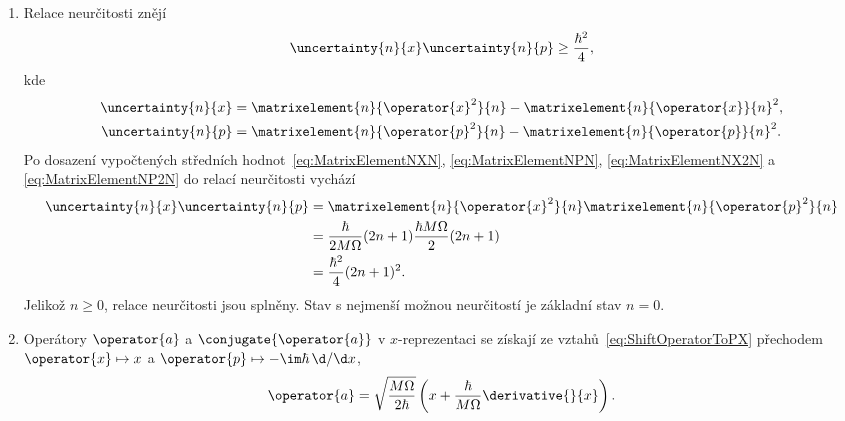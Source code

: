 \begin{solution}
\begin{enumerate}
	\item
		Relace neurčitosti znějí
		\begin{equation}
			\uncertainty{n}{x}\uncertainty{n}{p}\geq\frac{\hbar^{2}}{4},
		\end{equation}
		kde
		\begin{subequations}
			\begin{align}
				\uncertainty{n}{x}
					&=\matrixelement{n}{\operator{x}^{2}}{n}-\matrixelement{n}{\operator{x}}{n}^{2},\\
					\uncertainty{n}{p}
					&=\matrixelement{n}{\operator{p}^{2}}{n}-\matrixelement{n}{\operator{p}}{n}^{2}.
			\end{align}
		\end{subequations}
		Po dosazení vypočtených středních hodnot~\eqref{eq:MatrixElementNXN}, \eqref{eq:MatrixElementNPN}, \eqref{eq:MatrixElementNX2N} a \eqref{eq:MatrixElementNP2N} do relací neurčitosti vychází
		\begin{align}
			\uncertainty{n}{x}\uncertainty{n}{p}
				&=\matrixelement{n}{\operator{x}^{2}}{n}\matrixelement{n}{\operator{p}^{2}}{n}\nonumber\\
				&=\frac{\hbar}{2M\Omega}(2n+1)\frac{\hbar M\Omega}{2}(2n+1)\nonumber\\
				&=\frac{\hbar^{2}}{4}(2n+1)^{2}.
		\end{align}
		Jelikož $n\geq0$, relace neurčitosti jsou splněny.
        Stav s nejmenší možnou neurčitostí je základní stav $n=0$.
        
    \item 
        Operátory $\operator{a}$ a $\conjugate{\operator{a}}$ v $x$-reprezentaci se získají ze vztahů~\eqref{eq:ShiftOperatorToPX} přechodem $\operator{x}\mapsto x$ a $\operator{p}\mapsto-\im\hbar\,\d/\d x$,
        \begin{equation}\label{ShiftOperatorXRepresentation}
            \operator{a}
                =\sqrt{\frac{M\Omega}{2\hbar}}\left(x+\frac{\hbar}{M\Omega}\derivative{}{x}\right).
        \end{equation}


\end{enumerate}
\end{solution}
